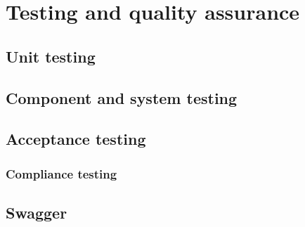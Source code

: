 \chapter{Testing and quality assurance}
\section{Unit testing}
\section{Component and system testing}
\section{Acceptance testing}
\subsection{Compliance testing}
\section{Swagger}

